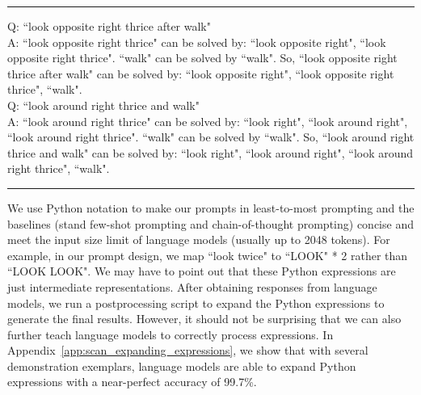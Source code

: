 \documentclass{article}
\begin{document}
\begin{table}[h!]
\centering
\hrule
\parbox{0.97\textwidth}{
\vspace{5pt}

Q: ``look opposite right thrice after walk"\\
A: ``look opposite right thrice" can be solved by: ``look opposite right", ``look opposite right thrice". ``walk" can be solved by ``walk". So, ``look opposite right thrice after walk" can be solved by: ``look opposite right", ``look opposite right thrice", ``walk".\\ 

 
Q:  ``look around right thrice and walk" \\ 
A: ``look around right thrice" can be solved by: ``look right", ``look around right", ``look around right thrice". ``walk" can be solved by ``walk". So, ``look around right thrice and walk" can be solved by: ``look right", ``look around right", ``look around right thrice", ``walk".
\vspace{3pt}
}
\hrule
\vspace{5pt}
\caption {Two exemplars taken from the least-to-most prompt for decomposing a long command to a sequence of short commands. }
\label{table: scan-reducing}
\end{table}

We use Python notation to make our prompts in least-to-most prompting and the baselines (stand few-shot prompting and chain-of-thought prompting) concise and meet the input size limit of language models (usually up to 2048 tokens). For example,  in our prompt design, we map ``look twice" to ``LOOK" * 2  rather than ``LOOK LOOK". We may have to point out that these Python expressions are just intermediate representations.  After obtaining  responses from language models,  we run a postprocessing script to expand the Python expressions to generate the final results. However, it should not be surprising that we can also further teach language models to correctly process expressions. In Appendix~\ref{app:scan_expanding_expressions},  we show that with several demonstration exemplars, language models are able to expand Python expressions with a   near-perfect accuracy of 99.7\%. 
\end{document}
